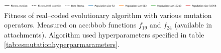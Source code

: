 \begin{figure}[ht!]
    \begin{minipage}{\textwidth}
        \centering
        \includegraphics[width=\textwidth]{img/runs/fitness_es_mutation_legend.pdf}
    \end{minipage}

    \caption[Fitness of various mutation operators in real--coded evolutionary algorithms]{Fitness of real--coded evolutionary algorithm with various mutation operators. Measured on \acrshort{acc:bbob} functions $f_{19}$ and $f_{24}$ (available in attachments). Algorithm used hyperparameters specified in table \ref{tab:esmutationhyperparmarameters}.}
    \label{meas:mutfitness}
\end{figure}



